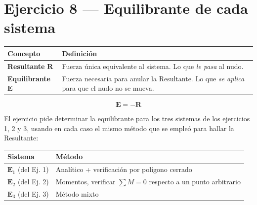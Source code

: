 \documentclass[
  spanish,
  11pt,
  a4paper,
]{article}
\begin{document}
\section{Ejercicio 8 --- Equilibrante de cada
sistema}\label{ejercicio-8-equilibrante-de-cada-sistema}

\begin{longtable}[]{@{}
  >{\raggedright\arraybackslash}p{}
  >{\raggedright\arraybackslash}p{}@{}}
\toprule\noalign{}
\begin{minipage}[b]{\linewidth}\raggedright
Concepto
\end{minipage} & \begin{minipage}[b]{\linewidth}\raggedright
Definición
\end{minipage} \\
\midrule\noalign{}
\endhead
\bottomrule\noalign{}
\endlastfoot
\textbf{Resultante} \(\mathbf{R}\) & Fuerza única equivalente al
sistema. Lo que \emph{le pasa} al nudo. \\
\textbf{Equilibrante} \(\mathbf{E}\) & Fuerza necesaria para anular la
Resultante. Lo que \emph{se aplica} para que el nudo no se mueva. \\
\end{longtable}

\[\mathbf{E} = -\mathbf{R}\]

El ejercicio pide determinar la equilibrante para los tres sistemas de
los ejercicios 1, 2 y 3, usando en cada caso el mismo método que se
empleó para hallar la Resultante:

\begin{longtable}[]{@{}
  >{\raggedright\arraybackslash}p{}
  >{\raggedright\arraybackslash}p{}@{}}
\toprule\noalign{}
\begin{minipage}[b]{\linewidth}\raggedright
Sistema
\end{minipage} & \begin{minipage}[b]{\linewidth}\raggedright
Método
\end{minipage} \\
\midrule\noalign{}
\endhead
\bottomrule\noalign{}
\endlastfoot
\(\mathbf{E}_1\) (del Ej. 1) & Analítico + verificación por polígono
cerrado \\
\(\mathbf{E}_2\) (del Ej. 2) & Momentos, verificar \(\sum M = 0\)
respecto a un punto arbitrario \\
\(\mathbf{E}_3\) (del Ej. 3) & Método mixto \\
\end{longtable}
\end{document}
